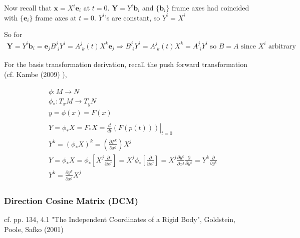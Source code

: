 \documentclass[10pt]{amsart}
\begin{document}
\begin{multicols*}{2}

Now recall that $\mathbf{x} = X^i \mathbf{e}_i$ at $t=0$. $\mathbf{Y} = Y^i \mathbf{b}_i$ and $\lbrace \mathbf{b}_i \rbrace$ frame axes had coincided with $\lbrace \mathbf{e}_i \rbrace$ frame axes at $t=0$. $Y^i$'s are constant, so $Y^i = X^i$

So for 
\begin{equation}\label{Eq:ActiveAndPassiveRotationsEqual}
\begin{gathered}
\mathbf{Y} = Y^i \mathbf{b}_i = \mathbf{e}_j B^j_{\, \, i} Y^i = A^j_{\, \, k}(t) X^k \mathbf{e}_j \Longrightarrow B^j_{\, \, i} Y^i = A^j_{\, \, k}(t) X^k = A^j_{\, \, i} Y^i \text{ so } \boxed{ B = A } \text{ since $X^i$ arbitrary }
\end{gathered}
\end{equation}

For the basis transformation derivation, recall the push forward transformation (cf. Kambe (2009) \cite{TKambe2009}),

\[
\begin{gathered}
	\begin{aligned}
	& \phi : M \to N \\
	& \phi_* : T_xM \to T_y N \\
	& y = \phi(x) = F(x)
	\end{aligned} \\
\begin{aligned} 
& Y = \phi_* X = F_* X = \left. \frac{d}{dt} (F(p(t))) \right|_{t=0} \\
& Y^k = (\phi_* X)^k = \left( \frac{ \partial F^k }{ \partial x^j } \right) X^j \\
& Y = \phi_* X = \phi_* \left[ X^j \frac{ \partial }{ \partial x^j } \right] = X^j \phi_* \left[ \frac{ \partial }{ \partial x^j } \right] = X^j \frac{ \partial y^k}{ \partial x^j} \frac{ \partial }{ \partial y^k } = Y^k \frac{ \partial }{ \partial y^k } \\
& Y^k  = \frac{ \partial y^k }{ \partial x^j } X^j
\end{aligned} 
\end{gathered}
\]

\subsubsection{Direction Cosine Matrix (DCM)}

cf. pp. 134, 4.1 "The Independent Coordinates of a Rigid Body", Goldstein, Poole, Safko (2001) \cite{GPS2001}


\end{multicols*}
\end{document}
